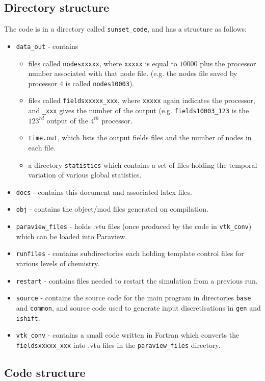 \documentclass[notitlepage]{revtex4-1}
\begin{document}
\subsection{Directory structure}

The code is in a directory called \verb|sunset_code|, and has a structure as follows:
\begin{itemize}
\item \verb|data_out| - contains
\begin{itemize}
\item files called \verb|nodesxxxxx|, where \verb|xxxxx| is equal to $10000$ plus the processor number associated with that node file. (e.g. the nodes file saved by processor $4$ is called \verb|nodes10003|).
\item files called \verb|fieldsxxxxx_xxx|, where \verb|xxxxx| again indicates the processor, and \verb|_xxx| gives the number of the output (e.g. \verb|fields10003_123| is the $123^{rd}$ output of the $4^{th}$ processor.
\item \verb|time.out|, which lists the output fields files and the number of nodes in each file.
\item a directory \verb|statistics| which contains a set of files holding the temporal variation of various global statistics. 
\end{itemize}
\item \verb|docs| - contains this document and associated latex files.
\item \verb|obj| - contains the object/mod files generated on compilation.
\item \verb|paraview_files| - holds .vtu files (once produced by the code in \verb|vtk_conv|) which can be loaded into Paraview.
\item \verb|runfiles| - contains subdirectories each holding template control files for various levels of chemistry.
\item \verb|restart| - contains files needed to restart the simulation from a previous run.
\item \verb|source| - contains the source code for the main program in directories \verb|base| and \verb|common|, and source code used to generate input discretisations in \verb|gen| and \verb|ishift|.
\item \verb|vtk_conv| - contains a small code written in Fortran which converts the \verb|fieldsxxxxx_xxx| into .vtu files in the \verb|paraview_files| directory.
\end{itemize}

\subsection{Code structure}
\end{document}
